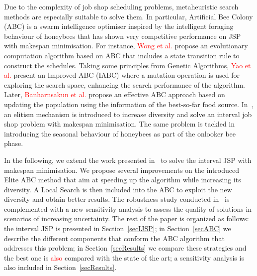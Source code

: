 \documentclass[sn-mathphys]{sn-jnl}%
\theoremstyle{thmstyleone}%
\theoremstyle{thmstyletwo}%
\theoremstyle{thmstylethree}%
\newcommand{\review}[1]{\textcolor{red}{#1}} %
\begin{document}
Due to the complexity of job shop scheduling problems, metaheuristic search methods are especially suitable to solve them. In particular, Artificial Bee Colony (ABC) is a swarm intelligence optimiser inspired by the intelligent foraging behaviour of honeybees that has shown very competitive performance on JSP with makespan minimisation. For instance, \review{Wong et al.} \cite{Wong2008} propose an evolutionary computation algorithm based on ABC that includes a state transition rule to construct the schedules. Taking some principles from Genetic Algorithms, \review{Yao et al.} \cite{Yao2010} present an Improved ABC (IABC) where a mutation operation is used for exploring the search space, enhancing the search performance of the algorithm. Later, \review{Banharnsakun et al.} \cite{Banharnsakun2012} propose an effective ABC approach based on updating the population using the information of the best-so-far food source. In~\cite{Diaz2022}, an elitism mechanism is introduced to increase diversity and solve an interval job shop problem with makespan minimisation. The same problem is tackled in~\cite{Diaz2023-ICAE} introducing the seasonal behaviour of honeybees as part of the onlooker bee phase.

In the following, we extend the work presented in~\cite{Diaz2022} to solve the interval JSP with makespan minimisation. We propose several improvements on the introduced Elite ABC method that aim at speeding up the algorithm while increasing its diversity. A Local Search is then included into the ABC to exploit the new diversity and obtain better results. The robustness study conducted in~\cite{Diaz2022} is complemented with a new sensitivity analysis to assess the quality of solutions in scenarios of increasing uncertainty. The rest of the paper is organized as follows: the interval JSP is presented in Section~\ref{secIJSP}; in Section~\ref{secABC} we describe the different components that conform the ABC algorithm that addresses this problem; in Section~\ref{secResults} we compare these strategies and the best one is \review{also} compared with the state of the art; a sensitivity analysis is also included in Section~\ref{secResults}.

\end{document}
